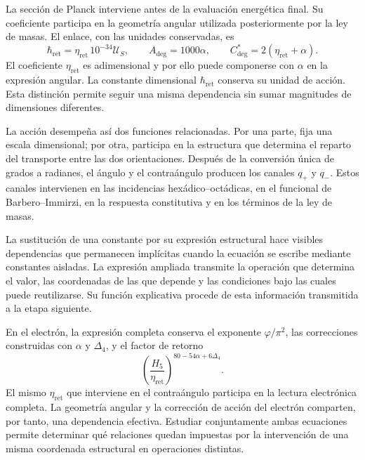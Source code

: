 La sección de Planck interviene antes de la evaluación energética final.
Su coeficiente participa en la geometría angular utilizada posteriormente
por la ley de masas. El enlace, con las unidades conservadas, es
\begin{equation}
 \hbar_{\mathrm{ret}}
   =\eta_{\mathrm{ret}}\,10^{-34}\mathcal U_S,
 \qquad
 A_{\deg}=1000\alpha,
 \qquad
 C^*_{\deg}=2(\eta_{\mathrm{ret}}+\alpha).
 \label{eq:narrativa-par-angular}
\end{equation}
El coeficiente $\eta_{\mathrm{ret}}$ es adimensional y por ello puede
componerse con $\alpha$ en la expresión angular. La constante dimensional
$\hbar_{\mathrm{ret}}$ conserva su unidad de acción. Esta distinción permite
seguir una misma dependencia sin sumar magnitudes de dimensiones diferentes.

La acción desempeña así dos funciones relacionadas. Por una parte, fija una
escala dimensional; por otra, participa en la estructura que determina el
reparto del transporte entre las dos orientaciones. Después de la conversión
única de grados a radianes, el ángulo y el contraángulo producen los canales
$q_+$ y $q_-$. Estos canales intervienen en las incidencias hexádico--octádicas,
en el funcional de Barbero--Immirzi, en la respuesta constitutiva y en los
términos de la ley de masas.

La sustitución de una constante por su expresión estructural hace visibles
dependencias que permanecen implícitas cuando la ecuación se escribe mediante
constantes aisladas. La expresión ampliada transmite la operación que
determina el valor, las coordenadas de las que depende y las condiciones
bajo las cuales puede reutilizarse. Su función explicativa procede de esta
información transmitida a la etapa siguiente.

En el electrón, la expresión completa conserva el exponente
$\varphi/\pi^2$, las correcciones construidas con $\alpha$ y $\Delta_4$,
y el factor de retorno
\begin{equation}
 \left(\frac{H_5}{\eta_{\mathrm{ret}}}\right)^{80-54\alpha+6\Delta_4}.
 \label{eq:narrativa-factor-electronico}
\end{equation}
El mismo $\eta_{\mathrm{ret}}$ que interviene en el contraángulo participa
en la lectura electrónica completa. La geometría angular y la corrección
de acción del electrón comparten, por tanto, una dependencia efectiva.
Estudiar conjuntamente ambas ecuaciones permite determinar qué relaciones
quedan impuestas por la intervención de una misma coordenada estructural
en operaciones distintas.

